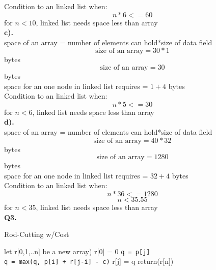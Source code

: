 \documentclass[11pt]{article}
\begin{document}
Condition to an linked list when:\\
$$n*6 <= 60$$
for $n < 10$, linked list needs space less than array\\
\textbf{c).}\\
space of an array = number of elements can hold*size of data field\\
$$\text{size of an array} = 30*1$$ bytes\\
$$\text{size of an array} = 30$$ bytes\\
space for an one node in linked list requires  = $1 + 4$ bytes\\
Condition to an linked list when:\\
$$n*5 <= 30$$
for $n <6$, linked list needs space less than array\\
\textbf{d).}\\
space of an array = number of elements can hold*size of data field\\
$$\text{size of an array} = 40*32$$ bytes\\
$$\text{size of an array} = 1280$$ bytes\\
space for an one node in linked list requires  = $32 + 4$ bytes\\
Condition to an linked list when:\\
$$n*36 <= 1280$$
$$n < 35.55$$
for $n < 35$, linked list needs space less than array\\
\hline
\vspace{5mm}
\textbf{Q3.}\\
\begin{algorithm}
\caption{Rod-Cutting w/Cost}\label{euclid}
\begin{algorithmic}[1]
\State let r[0,1,..n] be a new array)
\State r[0] = 0
        \State \texttt{q = p[j]}\\
        \State \texttt{q = max({q, p[i] + r[j-i] - c})}
      \EndFor
      r[j] = q
      \EndFor
      \State return(r[n])
\EndProcedure
\end{algorithmic}
\end{algorithm}
\end{document}
